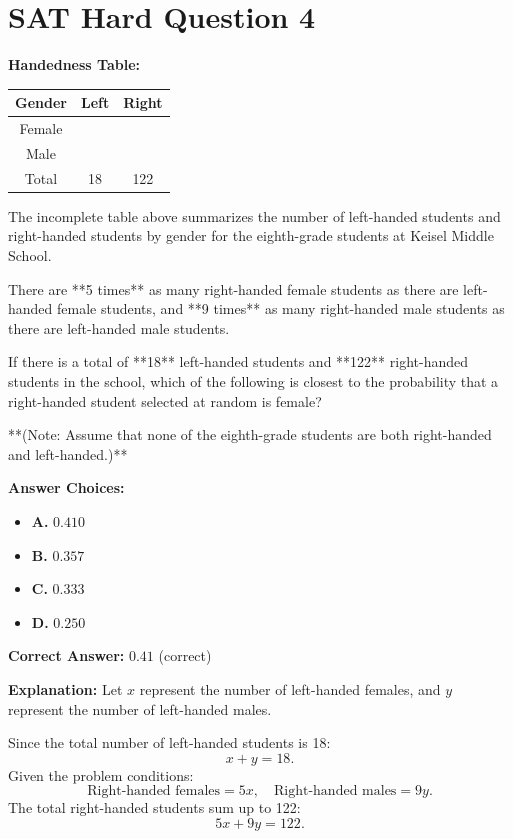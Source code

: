 \documentclass[12pt]{article}
\begin{document}
\section*{SAT Hard Question 4}
\begin{tcolorbox}[colback=green!10, colframe=green!50!black, title=Question 29: Probability (Statistics)]
\textbf{Handedness Table:}

\begin{center}
\begin{tabular}{|c|c|c|}
\hline
\textbf{Gender} & \textbf{Left} & \textbf{Right} \\
\hline
Female &  &  \\
\hline
Male &  &  \\
\hline
Total & 18 & 122 \\
\hline
\end{tabular}
\end{center}

The incomplete table above summarizes the number of left-handed students and right-handed students by gender for the eighth-grade students at Keisel Middle School. 

There are **5 times** as many right-handed female students as there are left-handed female students, and **9 times** as many right-handed male students as there are left-handed male students.

If there is a total of **18** left-handed students and **122** right-handed students in the school, which of the following is closest to the probability that a right-handed student selected at random is female?

**(Note: Assume that none of the eighth-grade students are both right-handed and left-handed.)**

\textbf{Answer Choices:}
\begin{itemize}
    \item \textbf{A.} \( 0.410 \) 
    \item \textbf{B.} \( 0.357 \)
    \item \textbf{C.} \( 0.333 \)
    \item \textbf{D.} \( 0.250 \)
\end{itemize}

\textbf{Correct Answer:} \( 0.41 \) (correct)

\textbf{Explanation:} 
Let \( x \) represent the number of left-handed females, and \( y \) represent the number of left-handed males.

Since the total number of left-handed students is 18:
\[
x + y = 18.
\]
Given the problem conditions:
\[
\text{Right-handed females} = 5x, \quad \text{Right-handed males} = 9y.
\]
The total right-handed students sum up to 122:
\[
5x + 9y = 122.
\]

\end{tcolorbox}
\end{document}

